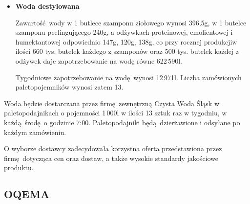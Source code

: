 \begin{itemize}
	\item \textbf{Woda destylowana}

	Zawartość wody w 1 butlece szamponu ziołowego wynosi 396,5g, w 1 butelce szamponu peelingującego 240g, a odżywkach proteinowej, emolientowej i humektantowej odpowiednio 147g, 120g, 138g, co przy rocznej produkcjiw ilości 660 tys. butelek każdego z szamponów oraz 500 tys. butelek każdej z odżywek daje zapotrzebowanie na wodę równe 622\,590l.

		Tygodniowe zapotrzebowanie na wodę wynosi 12\,971l. Liczba zamówionych paletopojemników wynosi zatem 13.
\end{itemize}\vspace{\baselineskip}

		Woda będzie dostarczana przez firmę zewnętrzną \textsf{Czysta Woda Śląsk} w paletopodajnikach o pojemności 1\,000l w ilości 13 sztuk raz w tygodniu, w każdą środę o godzinie 7:00. Paletopodajniki będą dzierżawione i odsyłane po każdym zamówieniu.

		O wyborze dostawcy zadecydowała korzystna oferta przedstawiona przez firmę dotycząca cen oraz dostaw, a także wysokie standardy jakościowe produktu.


\subsection{\textsf{OQEMA}}

